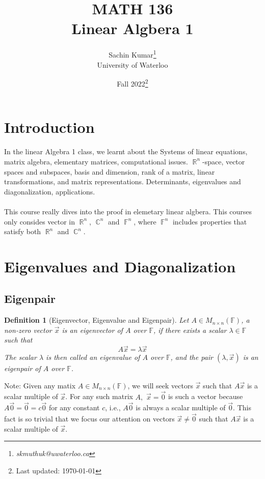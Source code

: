 \documentclass[10pt]{article}
\DeclareMathOperator{\R}{{\mathbb{R}}}
\DeclareMathOperator{\C}{{\mathbb{C}}}
\DeclareMathOperator{\F}{{\mathbb{F}}}
\theoremstyle{break}
\newtheorem{defn}{Definition}[subsection]
\newcommand{\subject}{MATH 136 \\ Linear Algbera 1}
\newcommand{\semester}{Fall 2022}
\begin{document}
\let\ref\Cref

\title{\subject}
\author{Sachin Kumar\thanks{\itshape skmuthuk@uwaterloo.ca}\\ University of Waterloo}
\date{\semester\thanks{Last updated: \today}}

\maketitle
\newpage
\tableofcontents
\setcounter{section}{-1}
\newpage







\section{Introduction}
In the linear Algebra 1 class, we learnt about the Systems of linear equations, matrix algebra, elementary matrices, computational issues. $\R^n$-space, vector spaces and subspaces, basis and dimension, rank of a matrix, linear transformations, and matrix representations. Determinants, eigenvalues and diagonalization, applications. 
\\ \vspace{0.5ex} \\
This course really dives into the proof in elemetary linear algbera. This courses only consides vector in $\R^n$, $\C^n$ and $\F^n$, where $\F^n$ includes properties that satisfy both $\R^n$ and $\C^n$.

\newpage

\section{Eigenvalues and Diagonalization}

\subsection{Eigenpair}
\begin{defn}[Eigenvector, Eigenvalue and Eigenpair]
    Let $A\in M_{n \times n}(\mathbb{F})$, a non-zero vector $\vec{x}$ is an eigenvector of $A$ over $\mathbb{F}$, if there exists a scalar $\lambda \in \mathbb{F}$ such that 
    $$A\vec{x} = \lambda \vec{x}$$
    The scalar $\lambda$  is then called an eigenvalue of $A$ over $\mathbb{F}$, and the pair $(\lambda, \vec{x})$ is an eigenpair of $A$ over $\mathbb{F}$.
\end{defn}
Note:
Given any matix $A \in M_{n \times n}(\mathbb{F})$, we will seek vectors $\vec{x} $ such that $A\vec{x}$ is a scalar multiple of $\vec{x}$. For any such matrix $A, $ $\vec{x} = \vec{0}$ is such a vector because $A\vec{0} = \vec{0} = c\vec{0}$ for any constant $c$, i.e., $A \vec{0}$ is always a scalar multiple of $\vec{0}$. This fact is so trivial that we focus our attention on vectors $\vec{x} \ne \vec{0}$ such that $A \vec{x} $ is a scalar multiple of $\vec{x}$.
\end{document}
